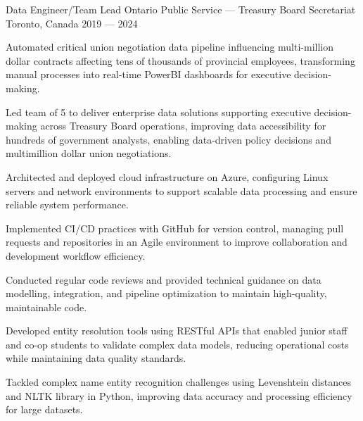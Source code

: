 \begin{cventries}
 \cventry%
 {Data Engineer/Team Lead}
 {Ontario Public Service --- Treasury Board Secretariat}
 {Toronto, Canada}
 {2019 --- 2024}
 {
    \begin{cvitems}
        \item Automated critical union negotiation data pipeline influencing multi-million dollar contracts affecting tens of thousands of provincial employees, transforming manual processes into real-time PowerBI dashboards for executive decision-making.
        \item Led team of 5 to deliver enterprise data solutions supporting executive decision-making across Treasury Board operations, improving data accessibility for hundreds of government analysts, enabling data-driven policy decisions and multimillion dollar union negotiations.
        \item Architected and deployed cloud infrastructure on Azure, configuring Linux servers and network environments to support scalable data processing and ensure reliable system performance.
        \item Implemented CI/CD practices with GitHub for version control, managing pull requests and repositories in an Agile environment to improve collaboration and development workflow efficiency.
        \item Conducted regular code reviews and provided technical guidance on data modelling, integration, and pipeline optimization to maintain high-quality, maintainable code.
        \item Developed entity resolution tools using RESTful APIs that enabled junior staff and co-op students to validate complex data models, reducing operational costs while maintaining data quality standards.
        \item Tackled complex name entity recognition challenges using Levenshtein distances and NLTK library in Python, improving data accuracy and processing efficiency for large datasets.
    \end{cvitems}
 }


\end{cventries}
